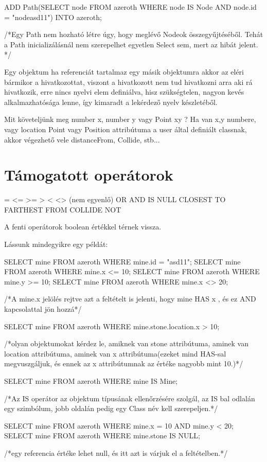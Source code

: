 \begin{sql}
ADD Path(SELECT node FROM azeroth WHERE node IS Node AND node.id = "nodeasd11") INTO azeroth;
\end{sql}

/*Egy Path nem hozható létre úgy, hogy  meglévő Nodeok összegyűjtéséből. Tehát a Path inicializálásnál nem szerepelhet egyetlen Select sem, mert az hibát jelent. */

Egy objektum ha referenciát tartalmaz egy másik objektumra akkor az eléri bármikor a hivatkozottat, viszont a hivatkozott nem tud hivatkozni arra aki rá hivatkozik, erre nincs nyelvi elem definiálva, hisz szükségtelen, nagyon kevés alkalmazhatósága lenne, így kimaradt a lekérdező nyelv készletéből.

Mit követeljünk meg number x, number y vagy Point xy ?
Ha van x,y numbere, vagy location Point vagy Position attribútuma a user által definiált classnak, akkor végezhető vele distanceFrom, Collide, stb...

\section{Támogatott operátorok}

= 
<= 
>= 
> 
< 
<> (nem egyenlő) 
OR 
AND 
IS 
NULL
CLOSEST TO
FARTHEST FROM
COLLIDE
NOT

A fenti operátorok boolean értékkel térnek vissza.

Lássunk mindegyikre egy példát:
\begin{sql}
SELECT mine FROM azeroth WHERE mine.id = "asd11";
SELECT mine FROM azeroth WHERE mine.x <= 10;
SELECT mine FROM azeroth WHERE mine.y >= 10;
SELECT mine FROM azeroth WHERE mine.x <> 20;
\end{sql}

/*A mine.x jelölés rejtve azt a feltételt is jelenti, hogy mine HAS x , és ez AND kapcsolattal jön hozzá*/
\begin{sql}
SELECT mine FROM azeroth WHERE mine.stone.location.x > 10;
\end{sql}

/*olyan objektumokat kérdez le, amiknek van stone attribútuma, aminek van location attribútuma, aminek van x attribútuma(ezeket mind HAS-sal megvuszgáljuk, és ennek az x attribútumnak az értéke nagyobb mint 10.)*/
\begin{sql}
SELECT mine FROM azeroth WHERE mine IS Mine;
\end{sql}
/*Az IS operátor az objektum típusának ellenőrzésére szolgál, az IS bal odlalán egy szimbólum, jobb oldalán pedig egy Class név kell szerepeljen.*/
\begin{sql}
SELECT mine FROM azeroth WHERE mine.x = 10 AND mine.y < 20;
SELECT mine FROM azeroth WHERE mine.stone IS NULL;
\end{sql}
/*egy referencia értéke lehet null, és itt azt is várjuk el a feltételben.*/

